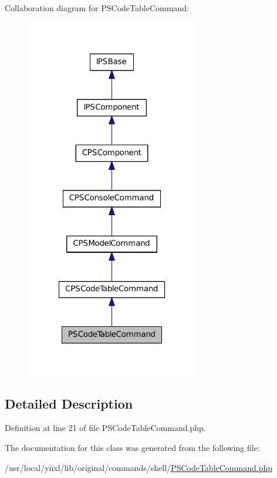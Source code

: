 Collaboration diagram for PSCodeTableCommand:\nopagebreak
\begin{figure}[H]
\begin{center}
\leavevmode
\includegraphics[width=214pt]{classPSCodeTableCommand__coll__graph}
\end{center}
\end{figure}


\subsection{Detailed Description}


Definition at line 21 of file PSCodeTableCommand.php.



The documentation for this class was generated from the following file:\begin{DoxyCompactItemize}
\item 
/usr/local/yiixl/lib/original/commands/shell/\hyperlink{PSCodeTableCommand_8php}{PSCodeTableCommand.php}\end{DoxyCompactItemize}
